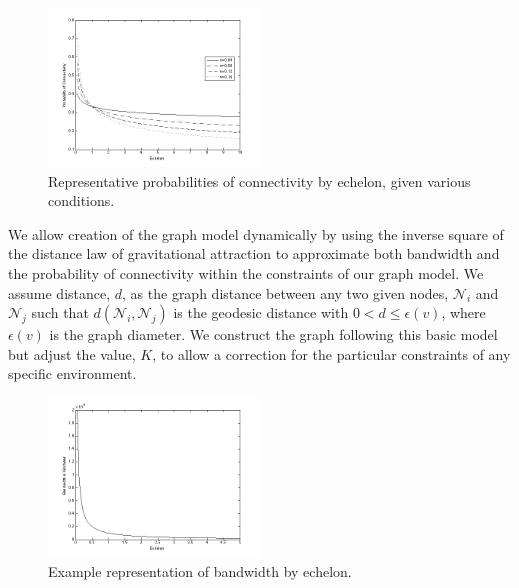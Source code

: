 \documentclass[10pt]{./IEEEtran}
\begin{document}
\begin{figure}[h!]
  \centering
    \includegraphics[width=0.5\textwidth]{images/probcon}
  \caption{Representative probabilities of connectivity by echelon, given various conditions.}
  \label{fig:probcon}
\end{figure}

We allow creation of the graph model dynamically by using the inverse square of the distance law of gravitational attraction to approximate both bandwidth and the probability of connectivity within the constraints of our graph model.   We assume distance, $d$, as the graph distance between any two given nodes, $\mathscr{N}_i$ and $\mathscr{N}_j$ such that $d(\mathscr{N}_{i}, \mathscr{N}_{j})$ is the geodesic distance with $0<d\leq \epsilon(v)$, where $\epsilon(v)$ is the graph diameter.  We construct the graph following this basic model but adjust the value, $K$, to allow a correction for the particular constraints of any specific environment.

\begin{figure}[h!]
  \centering
    \includegraphics[width=0.5\textwidth]{images/bandwidth}
  \caption{Example representation of bandwidth by echelon.}
  \label{fig:bandwidth}
\end{figure}
\end{document}
